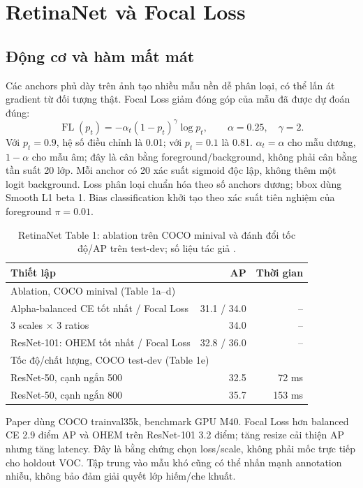\section{RetinaNet và Focal Loss}
\subsection{Động cơ và hàm mất mát}
Các anchors phủ dày trên ảnh tạo nhiều mẫu nền dễ phân loại, có thể lấn át
gradient từ đối tượng thật. Focal Loss \cite{retina} giảm đóng góp của mẫu đã được dự đoán đúng:
\begin{equation}
\operatorname{FL}(p_t)=-\alpha_t(1-p_t)^\gamma\log p_t,\qquad
\alpha=0.25,\quad\gamma=2.
\end{equation}
Với $p_t=0.9$, hệ số điều chỉnh là 0.01; với $p_t=0.1$ là 0.81.
$\alpha_t=\alpha$ cho mẫu dương, $1-\alpha$ cho mẫu âm; đây là cân bằng
foreground/background, không phải cân bằng tần suất 20 lớp.
Mỗi anchor có 20 xác suất sigmoid độc lập, không thêm một logit background.
Loss phân loại chuẩn hóa theo số anchors dương; bbox dùng Smooth L1
beta 1. Bias classification khởi tạo theo xác suất tiên nghiệm của foreground $\pi=0.01$.

\begin{table}[H]\centering\caption{RetinaNet Table 1: ablation trên COCO minival và đánh đổi tốc độ/AP trên test-dev; số liệu tác giả \cite{retina}.}
\small\begin{tabularx}{\linewidth}{Xrr}\toprule
Thiết lập & AP & Thời gian\\\midrule
\multicolumn{3}{l}{Ablation, COCO minival (Table 1a--d)}\\
Alpha-balanced CE tốt nhất / Focal Loss &31.1 / 34.0&--\\
3 scales $\times$ 3 ratios &34.0&--\\
ResNet-101: OHEM tốt nhất / Focal Loss &32.8 / 36.0&--\\
\multicolumn{3}{l}{Tốc độ/chất lượng, COCO test-dev (Table 1e)}\\
ResNet-50, cạnh ngắn 500 &32.5&72 ms\\
ResNet-50, cạnh ngắn 800 &35.7&153 ms\\\bottomrule
\end{tabularx}\label{table:a2-2}
\end{table}
Paper dùng COCO trainval35k, benchmark GPU M40. Focal Loss hơn balanced CE
2.9 điểm AP và OHEM trên ResNet-101 3.2 điểm; tăng resize cải thiện AP nhưng
tăng latency. Đây là bằng chứng chọn loss/scale, không phải mốc trực tiếp
cho holdout VOC. Tập trung vào mẫu khó cũng có thể nhấn mạnh annotation nhiễu,
không bảo đảm giải quyết lớp hiếm/che khuất.

